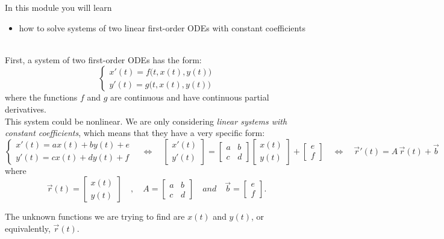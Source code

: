 In this module you will learn
\begin{itemize}
	\item how to solve systems of two linear first-order ODEs with constant coefficients
\end{itemize}

\hfill \\


First, a system of two first-order ODEs has the form:
$$
\begin{cases}
x'(t) = f\big(t, x(t),y(t)\big) \\	
y'(t) = g\big(t, x(t),y(t)\big)
\end{cases}
$$
where the functions $f$ and $g$ are continuous and have continuous partial derivatives. \\

This system could be nonlinear. We are only considering \emph{linear systems with constant coefficients}, which means that they have a very specific form:
$$
\begin{cases}
	x'(t) = a x(t) + b y(t) + e\\
	y'(t) = c x(t) + d y(t) + f
\end{cases}
%
\quad \Leftrightarrow \quad 
	\begin{bmatrix} x'(t) \\ y'(t) \end{bmatrix}
	=
	\begin{bmatrix} a & b \\ c & d \end{bmatrix}
	\begin{bmatrix} x(t) \\ y(t) \end{bmatrix}
	+	\begin{bmatrix} e \\ f \end{bmatrix}
%
\quad \Leftrightarrow \quad 
	\vec{r}'(t)
	=
	A \, \vec{r}(t) + \vec{b}
$$
where
$$
\vec{r}(t) = \begin{bmatrix} x(t) \\ y(t) \end{bmatrix}
\quad , \quad 
A = \begin{bmatrix} a & b \\ c & d \end{bmatrix}
\quad and \quad 
\vec{b}=\begin{bmatrix} e \\ f \end{bmatrix}.
$$

The unknown functions we are trying to find are $x(t)$ and $y(t)$, or equivalently, $\vec{r}(t)$. \\


